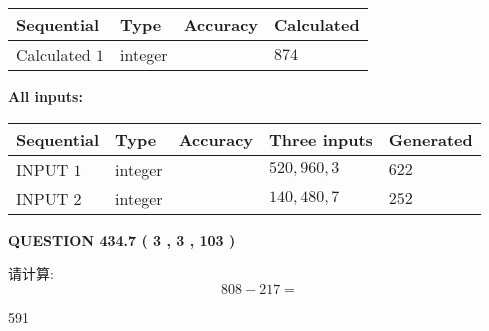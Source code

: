 \documentclass{ctexart}
\begin{document}
   
   
   
\noindent{}
   
   
  
  
\noindent\begin{tabular}{|l|l|l|l|}
\hline
 Sequential & Type & Accuracy & Calculated \\ 
\hline
 
 
  Calculated $  1 $ & integer &  & 
  $ 874 $ 
 \\  \hline  
 \end{tabular}
   
   
   
   
\noindent\vspace{0.1in}\hspace{-0.08in} {\textbf{\Large{All inputs: }}}
   
   
  
  
\noindent\begin{tabular}{|l|l|l|l|l|}
\hline
 Sequential & Type & Accuracy & Three inputs & Generated \\ 
\hline
 
 
  INPUT $  1 $ & integer &  & $
 520
 , 
 960
 , 
 3
 $ & $ 622 $ 
 \\  \hline  
 
 
  INPUT $  2 $ & integer &  & $
 140
 , 
 480
 , 
 7
 $ & $ 252 $ 
 \\  \hline  
 \end{tabular}
   
   
  
\vspace{0.2in}
  
{\textbf{\Large{QUESTION
434.7 
 ( 3 , 3 , 103 )
}}}
  
  
 
请计算:
\begin{equation}
808 -   %
217 = \nonumber
\end{equation}
 
 
 
\noindent{}
 
 

591
 
 
\noindent{}
 
 

 
 
 
\noindent{}
 
\end{document}
